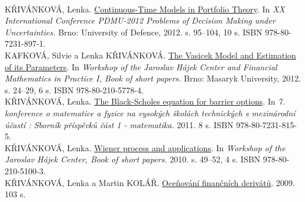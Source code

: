 \documentclass[10pt]{article}
\begin{document}
\vspace{1mm} \\
KŘIVÁNKOVÁ, Lenka. \href{http://www.muni.cz/research/publications/1077842}
	      {Continuous-Time Models in Portfolio Theory}. In  {\it XX International Conference PDMU-2012 Problems of Decision Making under Uncertainties.} Brno: University of Defence, 2012. s. 95--104, 10 s. ISBN 978-80-7231-897-1.
\vspace{1mm} \\
KAFKOVÁ, Silvie a Lenka KŘIVÁNKOVÁ.  \href{http://www.muni.cz/research/publications/976825}
	      {The Vasicek Model and Estimation of its Parameters}. In  {\it Workshop of the Jaroslav Hájek Center and Financial Mathematics in Practice I, Book of short papers.} Brno: Masaryk University, 2012. s. 24--29, 6 s. ISBN 978-80-210-5778-4.
\vspace{-3mm} \\
KŘIVÁNKOVÁ, Lenka.  \href{http://www.muni.cz/research/publications/979237}
	      {The Black-Scholes equation for barrier options}. In  {\it 7. konference o matematice a fyzice na vysokých školách technických s mezinárodní účastí : Sborník příspěvků část 1 - matematika.} 2011. 8 s. ISBN 978-80-7231-815-5.
\vspace{1mm} \\
KŘIVÁNKOVÁ, Lenka. \href{http://www.muni.cz/research/publications/979245}
	      {Wiener process and applications}. In  {\it Workshop of the Jaroslav Hájek Center, Book of short papers.} 2010. s. 49--52, 4 s. ISBN 978-80-210-5100-3.
\vspace{1mm} \\
KŘIVÁNKOVÁ, Lenka a Martin KOLÁŘ. \href{https://www.math.muni.cz/~vondra/uvm/vystupy/KA2/MF003/MF003.pdf}
	      {Oceňování finančních derivátů}. 2009. 103 s.

\end{document}
